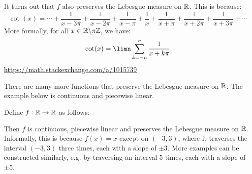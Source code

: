 \documentclass[main.tex]{subfiles}
\begin{document}
It turns out that $f$ also preserves the Lebesgue measure on $\R$. This is because:
\begin{equation*}
    \cot(x) = \cdots + \frac{1}{x-3\pi} + \frac{1}{x-2\pi} + \frac{1}{x-\pi} + \frac{1}{x} + \frac{1}{x+\pi} + \frac{1}{x+2\pi} + \frac{1}{x+3\pi} + \cdots
\end{equation*}
More formally, for all $x\in\R\exc\pi\Z$, we have:
\begin{equation*}
    \cot(x) = \limn\sum_{k=-n}^n \frac{1}{x+k\pi}
\end{equation*}
\url{https://math.stackexchange.com/a/1015739}


There are many more functions that preserve the Lebesgue measure on $\R$. The example below is continuous and piecewise linear.

\begin{example}
    Define $f:\R\to\R$ as follows:
    \begin{center}
    \end{center}
    Then $f$ is continuous, piecewise linear and preserves the Lebesgue measure on $\R$. Informally, this is because $f(x)=x$ except on $(-3,3)$, where it traverses the interval $(-3,3)$ three times, each with a slope of $\pm 3$. More examples can be constructed similarly, e.g. by traversing an interval $5$ times, each with a slope of $\pm 5$.
\end{example}
\end{document}
